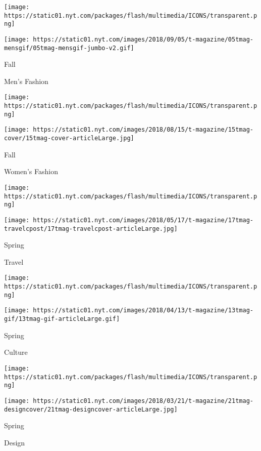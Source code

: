 \href{https://www.nytimes.com/issue/t-magazine/2018/08/31/ts-sept-9-mens-fashion-issue}{}

\texttt{[image: https://static01.nyt.com/packages/flash/multimedia/ICONS/transparent.png]}

\texttt{[image: https://static01.nyt.com/images/2018/09/05/t-magazine/05tmag-mensgif/05tmag-mensgif-jumbo-v2.gif]}

Fall

Men's Fashion

\href{https://www.nytimes.com/issue/t-magazine/2018/08/06/ts-aug-19-womens-fashion-issue}{}

\texttt{[image: https://static01.nyt.com/packages/flash/multimedia/ICONS/transparent.png]}

\texttt{[image: https://static01.nyt.com/images/2018/08/15/t-magazine/15tmag-cover/15tmag-cover-articleLarge.jpg]}

Fall

Women's Fashion

\href{https://www.nytimes.com/issue/t-magazine/2018/05/07/ts-may-20-travel-issue}{}

\texttt{[image: https://static01.nyt.com/packages/flash/multimedia/ICONS/transparent.png]}

\texttt{[image: https://static01.nyt.com/images/2018/05/17/t-magazine/17tmag-travelcpost/17tmag-travelcpost-articleLarge.jpg]}

Spring

Travel

\href{https://www.nytimes.com/issue/t-magazine/2018/04/06/ts-april-22-culture-issue}{}

\texttt{[image: https://static01.nyt.com/packages/flash/multimedia/ICONS/transparent.png]}

\texttt{[image: https://static01.nyt.com/images/2018/04/13/t-magazine/13tmag-gif/13tmag-gif-articleLarge.gif]}

Spring

Culture

\href{https://www.nytimes.com/issue/t-magazine/2018/03/13/ts-march-25-design-issue}{}

\texttt{[image: https://static01.nyt.com/packages/flash/multimedia/ICONS/transparent.png]}

\texttt{[image: https://static01.nyt.com/images/2018/03/21/t-magazine/21tmag-designcover/21tmag-designcover-articleLarge.jpg]}

Spring

Design

\href{https://www.nytimes.com/issue/t-magazine/2018/02/21/ts-march-4-mens-style-issue}{}

